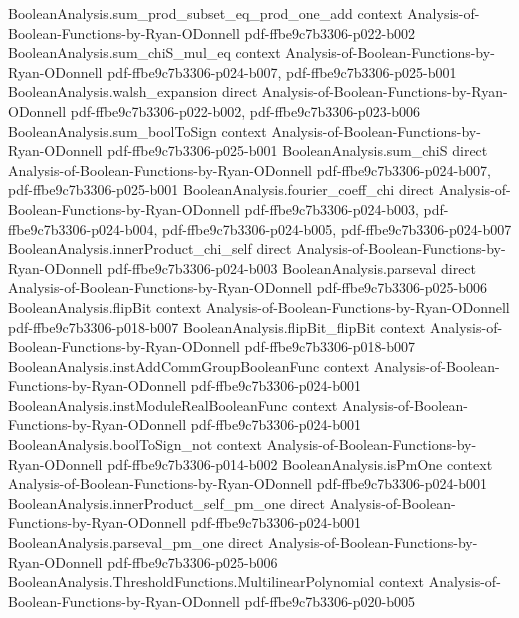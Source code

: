 \begin{lemma}
\proofstep
  {BooleanAnalysis.sum_prod_subset_eq_prod_one_add}
  {context}
  {Analysis-of-Boolean-Functions-by-Ryan-ODonnell}
  {pdf-ffbe9c7b3306-p022-b002}
\proofstep
  {BooleanAnalysis.sum_chiS_mul_eq}
  {context}
  {Analysis-of-Boolean-Functions-by-Ryan-ODonnell}
  {pdf-ffbe9c7b3306-p024-b007,
    pdf-ffbe9c7b3306-p025-b001}
\proofstep
  {BooleanAnalysis.walsh_expansion}
  {direct}
  {Analysis-of-Boolean-Functions-by-Ryan-ODonnell}
  {pdf-ffbe9c7b3306-p022-b002,
    pdf-ffbe9c7b3306-p023-b006}
\proofstep
  {BooleanAnalysis.sum_boolToSign}
  {context}
  {Analysis-of-Boolean-Functions-by-Ryan-ODonnell}
  {pdf-ffbe9c7b3306-p025-b001}
\proofstep
  {BooleanAnalysis.sum_chiS}
  {direct}
  {Analysis-of-Boolean-Functions-by-Ryan-ODonnell}
  {pdf-ffbe9c7b3306-p024-b007,
    pdf-ffbe9c7b3306-p025-b001}
\proofstep
  {BooleanAnalysis.fourier_coeff_chi}
  {direct}
  {Analysis-of-Boolean-Functions-by-Ryan-ODonnell}
  {pdf-ffbe9c7b3306-p024-b003,
    pdf-ffbe9c7b3306-p024-b004,
    pdf-ffbe9c7b3306-p024-b005,
    pdf-ffbe9c7b3306-p024-b007}
\proofstep
  {BooleanAnalysis.innerProduct_chi_self}
  {direct}
  {Analysis-of-Boolean-Functions-by-Ryan-ODonnell}
  {pdf-ffbe9c7b3306-p024-b003}
\proofstep
  {BooleanAnalysis.parseval}
  {direct}
  {Analysis-of-Boolean-Functions-by-Ryan-ODonnell}
  {pdf-ffbe9c7b3306-p025-b006}
\proofstep
  {BooleanAnalysis.flipBit}
  {context}
  {Analysis-of-Boolean-Functions-by-Ryan-ODonnell}
  {pdf-ffbe9c7b3306-p018-b007}
\proofstep
  {BooleanAnalysis.flipBit_flipBit}
  {context}
  {Analysis-of-Boolean-Functions-by-Ryan-ODonnell}
  {pdf-ffbe9c7b3306-p018-b007}
\proofstep
  {BooleanAnalysis.instAddCommGroupBooleanFunc}
  {context}
  {Analysis-of-Boolean-Functions-by-Ryan-ODonnell}
  {pdf-ffbe9c7b3306-p024-b001}
\proofstep
  {BooleanAnalysis.instModuleRealBooleanFunc}
  {context}
  {Analysis-of-Boolean-Functions-by-Ryan-ODonnell}
  {pdf-ffbe9c7b3306-p024-b001}
\proofstep
  {BooleanAnalysis.boolToSign_not}
  {context}
  {Analysis-of-Boolean-Functions-by-Ryan-ODonnell}
  {pdf-ffbe9c7b3306-p014-b002}
\proofstep
  {BooleanAnalysis.isPmOne}
  {context}
  {Analysis-of-Boolean-Functions-by-Ryan-ODonnell}
  {pdf-ffbe9c7b3306-p024-b001}
\proofstep
  {BooleanAnalysis.innerProduct_self_pm_one}
  {direct}
  {Analysis-of-Boolean-Functions-by-Ryan-ODonnell}
  {pdf-ffbe9c7b3306-p024-b001}
\proofstep
  {BooleanAnalysis.parseval_pm_one}
  {direct}
  {Analysis-of-Boolean-Functions-by-Ryan-ODonnell}
  {pdf-ffbe9c7b3306-p025-b006}
\proofstep
  {BooleanAnalysis.ThresholdFunctions.MultilinearPolynomial}
  {context}
  {Analysis-of-Boolean-Functions-by-Ryan-ODonnell}
  {pdf-ffbe9c7b3306-p020-b005}

\end{lemma}
